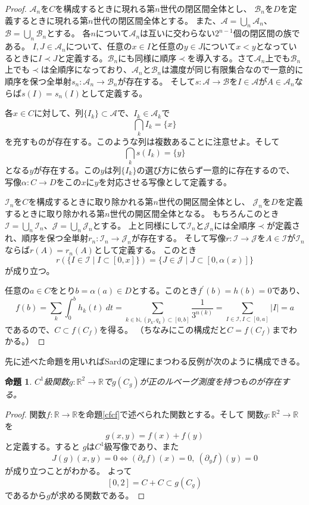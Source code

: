 \documentclass[leqno]{jsarticle}
\newtheorem{prop}[thm]{命題}
\newcommand{\nn}{\mathbb{N}}
\newcommand{\rr}{\mathbb{R}}
\begin{document}
\begin{proof}
$\mathcal{A}_n$を$C$を構成するときに現れる第$n$世代の閉区間全体とし、
$\mathcal{B}_n$を$D$を定義するときに現れる第$n$世代の閉区間全体とする。
また、$\mathcal{A}=\bigcup_n\mathcal{A}_n$、$\mathcal{B}=\bigcup_n\mathcal{B}_n$とする。
各$n$について$\mathcal{A}_n$は互いに交わらない$2^{n-1}$個の閉区間の族である。
$I,J\in \mathcal{A}_n$について、任意の$x\in I$と任意の$y\in J$について$x<y$となっているときに$I\prec J$と定義する。$\mathcal{B}_n$にも同様に順序$\prec$を導入する。さて$\mathcal{A}_n$上でも$\mathcal{B}_n$上でも$\prec$は全順序になっており、$\mathcal{A}_n$と$\mathcal{B}_n$は濃度が同じ有限集合なので一意的に順序を保つ全単射$s_n:\mathcal{A}_n\to \mathcal{B}_n$が存在する。
そして$s:\mathcal{A}\to \mathcal{B}$を$I\in \mathcal{A}$が$A\in \mathcal{A}_n$ならば$s(I)=s_n(I)$として定義する。

各$x\in C$に対して、列$\{I_k\}\subset \mathcal{A}$で、$I_k\in \mathcal{A}_k$で
\[
\bigcap_kI_k=\{x\}
\]
を充すものが存在する。このような列は複数あることに注意せよ。そして
\[
\bigcap_ks(I_k)=\{y\}
\]
となる$y$が存在する。この$y$は列$\{I_k\}$の選び方に依らず一意的に存在するので、
写像$\alpha:C\to D$をこの$x$に$y$を対応させる写像として定義する。

$\mathcal{I}_n$を$C$を構成するときに取り除かれる第$n$世代の開区間全体とし、
$\mathcal{J}_n$を$D$を定義するときに取り除かれる第$n$世代の開区間全体となる。
もちろんこのとき$\mathcal{I}=\bigcup_n\mathcal{I}_n$、$\mathcal{J}=\bigcup_n\mathcal{J}_n$とする。
上と同様にして$\mathcal{I}_n$と$\mathcal{J}_n$には全順序$\prec$が定義され、順序を保つ全単射$r_n:\mathcal{I}_n\to \mathcal{J}_n$が存在する。
そして写像$r:\mathcal{I}\to \mathcal{J}$を$A\in \mathcal{I}$が$\mathcal{I}_n$ならば$r(A)=r_n(A)$として定義する。
このとき
\[
r(\{I\in \mathcal{I}\mid I\subset [0,x]\})=\{J\in \mathcal{J}\mid J\subset [0,\alpha(x)]\}
\]
が成り立つ。

任意の$a\in C$をとり$b=\alpha(a)\in D$とする。このとき$f^{\prime}(b)=h(b)=0$であり、
\[
f(b)=\sum_{k}\int_0^{b}h_k(t)\ dt=\sum_{k\in \nn, (p_k,q_k)\subset [0,b]}\frac{1}{3^{n(k)}}=\sum_{I\in \mathcal{I}, I\subset [0,a]}|I|=a
\]
であるので、$C\subset  f(C_{f})$を得る。
（ちなみにこの構成だと$C=f(C_f)$までわかる。）
\end{proof}
先に述べた命題を用いればSardの定理にまつわる反例が次のように構成できる。
\begin{prop}
$C^1$級関数$g:\rr^2\to \rr$で$g(C_g)$が正のルベーグ測度を持つものが存在する。
\end{prop}
\begin{proof}
関数$f:\rr\to \rr$を命題\ref{cfcf}で述べられた関数とする。そして
関数$g:\rr^2\to \rr$を
\[
g(x,y)=f(x)+f(y)
\]
と定義する。すると
$g$は$C^1$級写像であり、また
\[
J(g)(x,y)=0\iff(\partial_xf)(x)=0,\ (\partial_yf)(y)=0
\]
が成り立つことがわかる。
よって
\[
[0,2]=C+C\subset g(C_g)
\]
であるから$g$が求める関数である。
\end{proof}
\end{document}
